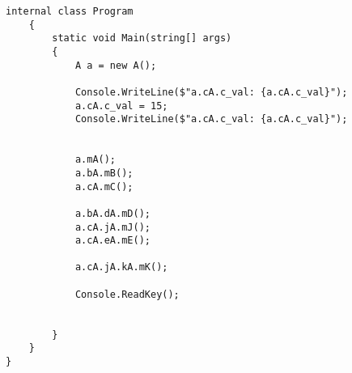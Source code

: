 \begin{lstlisting}[language={[Sharp]C}]
    internal class Program
    {
        static void Main(string[] args)
        {
            A a = new A();

            Console.WriteLine($"a.cA.c_val: {a.cA.c_val}");
            a.cA.c_val = 15;
            Console.WriteLine($"a.cA.c_val: {a.cA.c_val}");


            a.mA();
            a.bA.mB();
            a.cA.mC();

            a.bA.dA.mD();
            a.cA.jA.mJ();
            a.cA.eA.mE();

            a.cA.jA.kA.mK();

            Console.ReadKey();


        }
    }
}
\end{lstlisting}